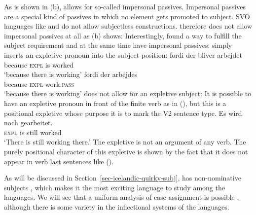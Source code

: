 As is shown in (b),  allows for so-called impersonal passives. Impersonal passives are
a special kind of passives in which no element gets promoted to subject. SVO languages like  and
 do not allow subjectless constructions.  therefore does not allow impersonal passives
at all as (b) shows:
\eal
{}
\zl
Interestingly,  found a way to fulfill the subject requirement and at the same time have
impersonal passives:  simply inserts an expletive pronoun into the subject position:
\eal
\label{ex-bliver-arbejder}
\ex 
\gll fordi der bliver arbejdet\\
     because \textsc{expl} is worked\\\danish
\glt `because there is working'
\ex
\gll fordi   der arbejdes\\
     because  \textsc{expl} work.\textsc{pass}\\
\glt `because there is working'
\zl
{} does not allow for an expletive subject:
\z
It is possible to have an expletive pronoun in front of the finite verb as in (), but this is
a positional expletive whose purpose it is to mark the V2 sentence type. 
\ea
\gll  Es wird noch gearbeitet.\\
      \textsc{expl} is still worked\\\german
\glt `There is still working there.'
\z
The expletive is not an argument of any verb. The purely positional character of this expletive is shown by the fact that it does not
appear in verb last sentences like ().%

As will be discussed in Section~\ref{sec-icelandic-quirky-subj},  has non-nominative subjects \citep{ZMT85a}, which makes it the most
exciting language to study among the  languages. We will see that a uniform analysis of case
assignment is possible \citep*{YMJ87}, although there is some variety in the inflectional systems of the  languages.

